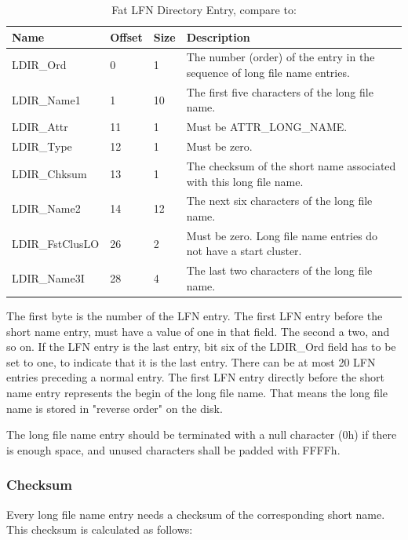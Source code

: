 \begin{table}[!ht]
\caption{Fat LFN Directory Entry, compare to: \cite{usb_ms_jan, fatgen103}}
\centering
\begin{tabular}{|l|l|l|p{8.5cm}|}
\hline\hline
\textbf{Name} & \textbf{Offset} & \textbf{Size} & \textbf{Description}\\ \hline
LDIR\_Ord & 0 & 1 & The number (order) of the entry in the sequence of long file name entries. \\ \hline
LDIR\_Name1 & 1 & 10 & The first five characters of the long file name. \\ \hline
LDIR\_Attr & 11 & 1 & Must be ATTR\_LONG\_NAME. \\ \hline
LDIR\_Type & 12 & 1 & Must be zero. \\ \hline
LDIR\_Chksum & 13 & 1 & The checksum of the short name associated with this long file name. \\ \hline
LDIR\_Name2& 14 & 12 & The next six characters of the long file name. \\ \hline
LDIR\_FstClusLO & 26 & 2 & Must be zero. Long file name entries do not have a start cluster. \\ \hline
LDIR\_Name3I & 28 & 4 & The last two characters of the long file name. \\ \hline
\end{tabular}
\label{table:fat_lfn_dir_entry}
\end{table}

The first byte is the number of the LFN entry. The first LFN entry before the short name entry, must have a value of one in that field. The second a two, and so on. If the LFN entry is the last entry, bit six of the LDIR\_Ord field has to be set to one, to indicate that it is the last entry. There can be at most 20 LFN entries preceding a normal entry. The first LFN entry directly before the short name entry represents the begin of the long file name. That means the long file name is stored in "reverse order" on the disk. 

The long file name entry should be terminated with a null character (0h) if there is enough space, and unused characters shall be padded with FFFFh\cite{fatgen103}.

\subsubsection{Checksum}

Every long file name entry needs a checksum of the corresponding short name. This checksum is calculated as follows:

